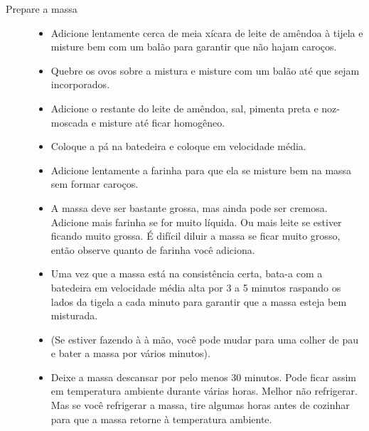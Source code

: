 \documentclass [11pt, letterpaper] {article}
\begin{document}
\begin {description}
\begin {description}
\item [Prepare a massa] 
\begin {itemize}
\item Adicione lentamente cerca de meia xícara de leite de amêndoa \`a tijela e misture bem com um balão para garantir que não hajam caro\c{c}os.
\item Quebre os ovos sobre a mistura e misture com um bal\~ao até que sejam incorporados.
\item Adicione o restante do leite de amêndoa, sal, pimenta preta e noz-moscada e misture até ficar homogêneo.
\item Coloque a p\'a na batedeira e coloque em velocidade média.
\item Adicione lentamente a farinha para que ela se misture bem na massa sem formar caro\c{c}os.
\item A massa deve ser bastante grossa, mas ainda pode ser cremosa. Adicione mais farinha se for muito l\'iquida. Ou mais leite se estiver ficando muito grossa. É difícil diluir a massa se ficar muito grosso, então observe quanto de farinha você adiciona.
\item Uma vez que a massa está na consistência certa, bata-a com a batedeira em velocidade m\'edia alta por 3 a 5 minutos raspando os lados da tigela a cada minuto para garantir que a massa esteja bem misturada.
\item (Se estiver fazendo \`a à mão, você pode mudar para uma colher de pau e bater a massa por vários minutos).
\item Deixe a massa descansar por pelo menos 30 minutos. Pode ficar assim em temperatura ambiente durante várias horas. Melhor não refrigerar. Mas se você refrigerar a massa, tire algumas horas antes de cozinhar para que a massa retorne 
\`a temperatura ambiente.
\end {itemize}



\end{description}
\end{description}
\end{document}
